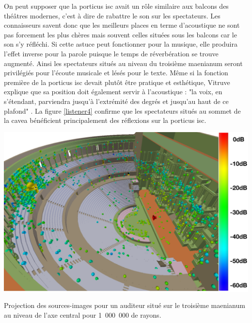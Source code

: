  

On peut supposer que la \gls{porticus isc} avait un rôle similaire aux balcons des théâtres modernes, c'est à dire de rabattre le son sur les spectateurs. Les connaisseurs savent donc que les meilleurs places en terme d'acoustique ne sont pas forcement les plus chères mais souvent celles situées sous les balcons car le son s'y réfléchi. Si cette astuce peut fonctionner pour la musique, elle produira l'effet inverse pour la parole puisque le temps de réverbération se trouve augmenté. Ainsi les spectateurs situés au niveau du troisième \gls{maenianum} seront privilégiés pour l'écoute musicale et lésés pour le texte. Même si la fonction première de la \gls{porticus isc} devait plutôt être pratique et esthétique, Vitruve explique que sa position doit également servir à l'acoustique : "la voix, en s'étendant, parviendra jusqu'à l'extrémité des degrés et jusqu'au haut de ce plafond" \cite[p.11]{vitruve}. La figure \ref{listener4} confirme que les spectateurs situés au sommet de la \gls{cavea} bénéficient principalement des réflexions sur la \gls{porticus isc}.
\begin{figureth}
	\includegraphics[width=0.8\linewidth]{images/Listener4}
	\caption{Projection des sources-images pour un auditeur situé sur le troisième \gls{maenianum} au niveau de l'axe central pour 1~000~000 de rayons.}
	\label{listener4}
\end{figureth}

